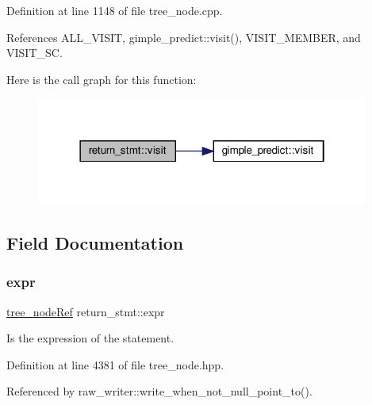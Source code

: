Definition at line 1148 of file tree\+\_\+node.\+cpp.



References A\+L\+L\+\_\+\+V\+I\+S\+IT, gimple\+\_\+predict\+::visit(), V\+I\+S\+I\+T\+\_\+\+M\+E\+M\+B\+ER, and V\+I\+S\+I\+T\+\_\+\+SC.

Here is the call graph for this function\+:
\nopagebreak
\begin{figure}[H]
\begin{center}
\leavevmode
\includegraphics[width=310pt]{d7/dba/structreturn__stmt_aef0ab55c5af1b107e05eddd7f4b4a88e_cgraph}
\end{center}
\end{figure}


\subsection{Field Documentation}
\mbox{\label{structreturn__stmt_a15ee3e28692fc6a52f6db84d3e0794a6}} 
\subsubsection{\texorpdfstring{expr}{expr}}
{\footnotesize\ttfamily \hyperlink{tree__node_8hpp_a6ee377554d1c4871ad66a337eaa67fd5}{tree\+\_\+node\+Ref} return\+\_\+stmt\+::expr}



Is the expression of the statement. 



Definition at line 4381 of file tree\+\_\+node.\+hpp.



Referenced by raw\+\_\+writer\+::write\+\_\+when\+\_\+not\+\_\+null\+\_\+point\+\_\+to().

\mbox{\label{structreturn__stmt_ad73a529fc824bd257b53c8c35c4060d9}} 
